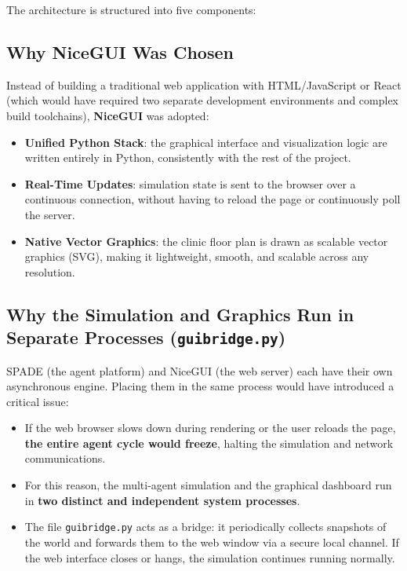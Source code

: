 \documentclass{article}
\renewcommand{\_}{\oldtextunderscore\allowbreak}
\begin{document}
The architecture is structured into five components:

\subsection{Why NiceGUI Was Chosen}
Instead of building a traditional web application with HTML/JavaScript or React (which would have required two separate development environments and complex build toolchains), \textbf{NiceGUI} was adopted:
\begin{itemize}
    \item \textbf{Unified Python Stack}: the graphical interface and visualization logic are written entirely in Python, consistently with the rest of the project.
    \item \textbf{Real-Time Updates}: simulation state is sent to the browser over a continuous connection, without having to reload the page or continuously poll the server.
    \item \textbf{Native Vector Graphics}: the clinic floor plan is drawn as scalable vector graphics (SVG), making it lightweight, smooth, and scalable across any resolution.
\end{itemize}

\subsection{Why the Simulation and Graphics Run in Separate Processes (\texttt{gui\_bridge.py})}
SPADE (the agent platform) and NiceGUI (the web server) each have their own asynchronous engine. Placing them in the same process would have introduced a critical issue:
\begin{itemize}
    \item If the web browser slows down during rendering or the user reloads the page, \textbf{the entire agent cycle would freeze}, halting the simulation and network communications.
    \item For this reason, the multi-agent simulation and the graphical dashboard run in \textbf{two distinct and independent system processes}.
    \item The file \texttt{gui\_bridge.py} acts as a bridge: it periodically collects snapshots of the world and forwards them to the web window via a secure local channel. If the web interface closes or hangs, the simulation continues running normally.
\end{itemize}
\end{document}
